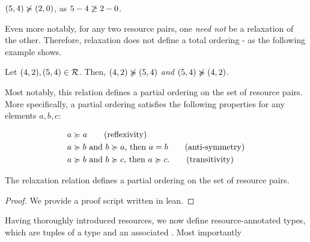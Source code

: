 \begin{example}
   \((5, 4) \notrelaxation (2, 0)\), as \(5 - 4 \centernot{\geq} 2 - 0\).
\end{example}

Even more notably, for any two resource pairs, one \emph{need not} be a relaxation of the other. Therefore, relaxation does not define a total ordering - as the following example shows.

\begin{example}
   Let \((4,2), (5,4) \in \mathcal{R}\). Then, \((4,2) \notrelaxation (5,4)\) \emph{and} \((5,4) \notrelaxation (4,2)\).
\end{example}

Most notably, this relation defines a partial ordering on the set of resource pairs. More specifically, a partial ordering satisfies the following properties for any elements \(a, b, c\):

\begin{align}
   & a \relaxation a \tag{reflexivity} \\
   & a \relaxation b \text{ and } b \relaxation a\text{, then } a = b \tag{anti-symmetry}\\
   & a \relaxation b \text{ and } b \relaxation c\text{, then } a \relaxation c. \tag{transitivity}
\end{align}

\begin{lemma}
   The relaxation relation defines a partial ordering on the set of resource pairs.
\end{lemma}

\begin{proof}
   We provide a proof script written in lean.
\end{proof}

Having thoroughly introduced resources, we now define resource-annotated types, which are tuples of a type and an associated . Most importantly
